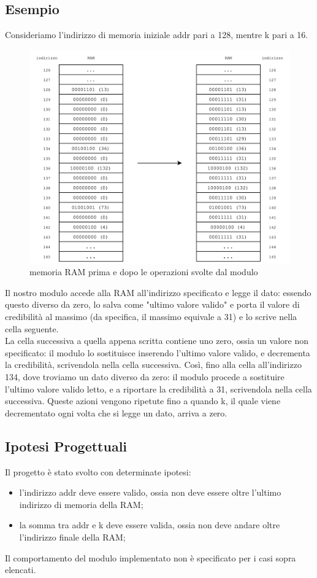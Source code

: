 \documentclass{article}
\begin{document}
\subsection{Esempio}
Consideriamo l'indirizzo di memoria iniziale addr pari a 128, mentre k pari a 16.

\begin{figure}[h]
    \centering
    \includegraphics[width=1\textwidth]{example.png}
    \caption[short]{memoria RAM prima e dopo le operazioni svolte dal modulo}
\end{figure}

Il nostro modulo accede alla RAM all'indirizzo specificato e legge il dato: essendo questo diverso da zero, lo salva come "ultimo valore valido" e porta il valore di credibilità al massimo (da specifica, il massimo equivale a 31) e lo scrive nella cella seguente.\\
La cella successiva a quella appena scritta contiene uno zero, ossia un valore non specificato: il modulo lo sostituisce inserendo l'ultimo valore valido, e decrementa la credibilità, scrivendola nella cella successiva. 
Così, fino alla cella all'indirizzo 134, dove troviamo un dato diverso da zero: il modulo procede a sostituire l'ultimo valore valido letto, e a riportare la credibilità a 31, scrivendola nella cella successiva.
Queste azioni vengono ripetute fino a quando k, il quale viene decrementato ogni volta che si legge un dato, arriva a zero.

\subsection{Ipotesi Progettuali}
Il progetto è stato svolto con determinate ipotesi:
\begin{itemize}
    \item l'indirizzo addr deve essere valido, ossia non deve essere oltre l'ultimo indirizzo di memoria della RAM;
    \item la somma tra addr e k deve essere valida, ossia non deve andare oltre l'indirizzo finale della RAM; 
\end{itemize}
Il comportamento del modulo implementato non è specificato per i casi sopra elencati.
\end{document}

